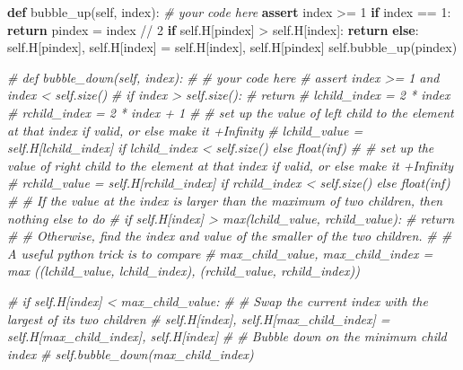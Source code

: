 \documentclass[
]{article}
\newenvironment{Shaded}{}{}
\newcommand{\CommentTok}[1]{\textcolor[rgb]{0.38,0.63,0.69}{\textit{#1}}}
\newcommand{\ControlFlowTok}[1]{\textcolor[rgb]{0.00,0.44,0.13}{\textbf{#1}}}
\newcommand{\DecValTok}[1]{\textcolor[rgb]{0.25,0.63,0.44}{#1}}
\newcommand{\KeywordTok}[1]{\textcolor[rgb]{0.00,0.44,0.13}{\textbf{#1}}}
\newcommand{\NormalTok}[1]{#1}
\newcommand{\OperatorTok}[1]{\textcolor[rgb]{0.40,0.40,0.40}{#1}}
\newcommand{\VariableTok}[1]{\textcolor[rgb]{0.10,0.09,0.49}{#1}}
\begin{document}
\begin{Shaded}
\begin{Highlighting}[]
    \KeywordTok{def}\NormalTok{ bubble\_up(}\VariableTok{self}\NormalTok{, index):}
        \CommentTok{\# your code here}
        \ControlFlowTok{assert}\NormalTok{ index }\OperatorTok{\textgreater{}=} \DecValTok{1}
        \ControlFlowTok{if}\NormalTok{ index }\OperatorTok{==} \DecValTok{1}\NormalTok{:}
            \ControlFlowTok{return}
\NormalTok{        pindex }\OperatorTok{=}\NormalTok{ index }\OperatorTok{//} \DecValTok{2}
        \ControlFlowTok{if} \VariableTok{self}\NormalTok{.H[pindex] }\OperatorTok{\textgreater{}} \VariableTok{self}\NormalTok{.H[index]:}
            \ControlFlowTok{return}
        \ControlFlowTok{else}\NormalTok{:}
            \VariableTok{self}\NormalTok{.H[pindex], }\VariableTok{self}\NormalTok{.H[index] }\OperatorTok{=} \VariableTok{self}\NormalTok{.H[index], }\VariableTok{self}\NormalTok{.H[pindex]}
            \VariableTok{self}\NormalTok{.bubble\_up(pindex)}


    \CommentTok{\# def bubble\_down(self, index):}
    \CommentTok{\#     \# your code here}
    \CommentTok{\#     assert index \textgreater{}= 1 and index \textless{} self.size()}
    \CommentTok{\#     if index \textgreater{} self.size():}
    \CommentTok{\#         return}
    \CommentTok{\#     lchild\_index = 2 * index}
    \CommentTok{\#     rchild\_index = 2 * index + 1}
    \CommentTok{\#     \# set up the value of left child to the element at that index if valid, or else make it +Infinity}
    \CommentTok{\#     lchild\_value = self.H[lchild\_index] if lchild\_index \textless{} self.size() else float(\textquotesingle{}inf\textquotesingle{})}
    \CommentTok{\#     \# set up the value of right child to the element at that index if valid, or else make it +Infinity}
    \CommentTok{\#     rchild\_value = self.H[rchild\_index] if rchild\_index \textless{} self.size() else float(\textquotesingle{}inf\textquotesingle{})}
    \CommentTok{\#     \# If the value at the index is larger than the maximum of two children, then nothing else to do}
    \CommentTok{\#     if self.H[index] \textgreater{} max(lchild\_value, rchild\_value):}
    \CommentTok{\#         return}
    \CommentTok{\#     \# Otherwise, find the index and value of the smaller of the two children.}
    \CommentTok{\#     \# A useful python trick is to compare}
    \CommentTok{\#     max\_child\_value, max\_child\_index = max ((lchild\_value, lchild\_index), (rchild\_value, rchild\_index))}

    \CommentTok{\#     if self.H[index] \textless{} max\_child\_value:}
    \CommentTok{\#       \# Swap the current index with the largest of its two children}
    \CommentTok{\#       self.H[index], self.H[max\_child\_index] = self.H[max\_child\_index], self.H[index]}
    \CommentTok{\#       \# Bubble down on the minimum child index}
    \CommentTok{\#       self.bubble\_down(max\_child\_index)}


\end{Highlighting}
\end{Shaded}
\end{document}
